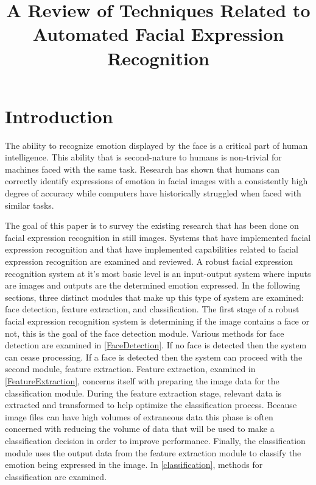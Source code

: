 \documentclass{IEEEtran}
\title{A Review of Techniques Related to Automated Facial Expression Recognition}
\author{\IEEEauthorblockN{Austin Dase}

\IEEEauthorblockA{Department of Computer and Information Sciences\\
Towson University\\
Towson, Maryland 21252\\
Email: adase1@students.towson.edu}}
\begin{document}
\maketitle

\tableofcontents

\section{Introduction}
The ability to recognize emotion displayed by the face is a critical part of human intelligence. This ability that is second-nature to humans is non-trivial for machines faced with the same task. Research has shown that humans can correctly identify expressions of emotion in facial images \cite{cecilione2017test} with a consistently high degree of accuracy while computers have historically struggled when faced with similar tasks. 

The goal of this paper is to survey the existing research that has been done on facial expression recognition in still images. Systems that have implemented facial expression recognition and that have implemented capabilities related to facial expression recognition are examined and reviewed. A robust facial expression recognition system at it's most basic level is an input-output system where inputs are images and outputs are the determined emotion expressed. In the following sections, three distinct modules that make up this type of system are examined: face detection, feature extraction, and classification. The first stage of a robust facial expression recognition system is determining if the image contains a face or not, this is the goal of the face detection module. Various methods for face detection are examined in \ref{FaceDetection}. If no face is detected then the system can cease processing. If a face is detected then the system can proceed with the second module, feature extraction. Feature extraction, examined in \ref{FeatureExtraction}, concerns itself with preparing the image data for the classification module. During the feature extraction stage, relevant data is extracted and transformed to help optimize the classification process. Because image files can have high volumes of extraneous data this phase is often concerned with reducing the volume of data that will be used to make a classification decision in order to improve performance. Finally, the classification module uses the output data from the feature extraction module to classify the emotion being expressed in the image. In \ref{classification}, methods for classification are examined.
\end{document}
